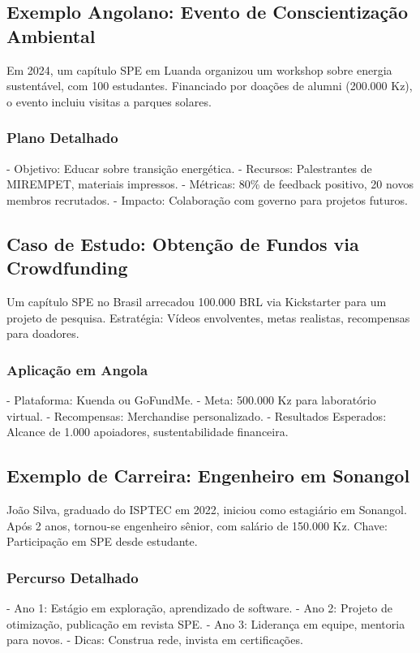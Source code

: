 \documentclass[12pt]{article}
\begin{document}
\subsection{Exemplo Angolano: Evento de Conscientização Ambiental}
Em 2024, um capítulo SPE em Luanda organizou um workshop sobre energia sustentável, com 100 estudantes. Financiado por doações de alumni (200.000 Kz), o evento incluiu visitas a parques solares.

\subsubsection{Plano Detalhado}
- Objetivo: Educar sobre transição energética.
- Recursos: Palestrantes de MIREMPET, materiais impressos.
- Métricas: 80\% de feedback positivo, 20 novos membros recrutados.
- Impacto: Colaboração com governo para projetos futuros.

\subsection{Caso de Estudo: Obtenção de Fundos via Crowdfunding}
Um capítulo SPE no Brasil arrecadou 100.000 BRL via Kickstarter para um projeto de pesquisa. Estratégia: Vídeos envolventes, metas realistas, recompensas para doadores.

\subsubsection{Aplicação em Angola}
- Plataforma: Kuenda ou GoFundMe.
- Meta: 500.000 Kz para laboratório virtual.
- Recompensas: Merchandise personalizado.
- Resultados Esperados: Alcance de 1.000 apoiadores, sustentabilidade financeira.

\subsection{Exemplo de Carreira: Engenheiro em Sonangol}
João Silva, graduado do ISPTEC em 2022, iniciou como estagiário em Sonangol. Após 2 anos, tornou-se engenheiro sênior, com salário de 150.000 Kz. Chave: Participação em SPE desde estudante.

\subsubsection{Percurso Detalhado}
- Ano 1: Estágio em exploração, aprendizado de software.
- Ano 2: Projeto de otimização, publicação em revista SPE.
- Ano 3: Liderança em equipe, mentoria para novos.
- Dicas: Construa rede, invista em certificações.
\end{document}
